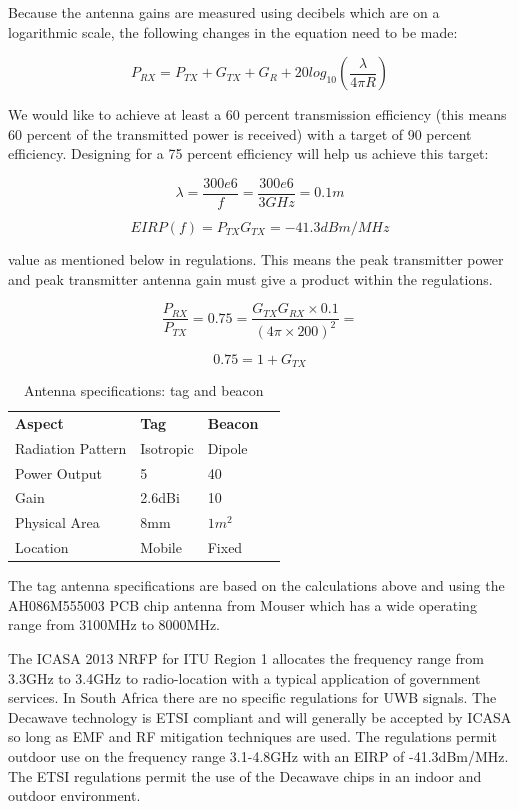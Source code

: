 Because the antenna gains are measured using decibels which are on a logarithmic scale, the following changes in the equation need to be made:

$$P_{RX} = P_{TX} + G_{TX} + G_{R} + 20log_{10}(\frac{\lambda}{4 \pi R})$$


We would like to achieve at least a 60 percent transmission efficiency (this means 60 percent of the transmitted power is received) with a target of 90 percent efficiency. Designing for a 75 percent efficiency will help us achieve this target: 

$$\lambda = \frac{300e6}{f} = \frac{300e6}{3GHz} = 0.1m$$

$$EIRP(f) = P_{TX}G_{TX} = -41.3dBm/MHz$$
\begin{center}
value as mentioned below in regulations. This means the peak transmitter power and peak transmitter antenna gain must give a product within the regulations.
\end{center}

$$\frac{P_{RX}}{P_{TX}} = 0.75 = \frac{G_{TX}G_{RX} \times 0.1}{(4 \pi \times 200)^2} = $$

$$0.75 = 1 + G_{TX}$$

\begin{table}[H]
\centering
\caption{Antenna specifications: tag and beacon}
\label{antenna-specs}
\begin{tabular}{l l l l}
\textbf{Aspect}                      & \textbf{Tag} & \textbf{Beacon} \\ 
Radiation Pattern    	& Isotropic             & Dipole              \\
Power Output 			& 5                     & 40                     \\
Gain                 	& 2.6dBi                     & 10                    \\
Physical Area 			& 8mm					 & $1m^2$          \\         
Location 				& Mobile                & Fixed                    \\         
\end{tabular}
\end{table}

The tag antenna specifications are based on the calculations above and using the AH086M555003 PCB chip antenna from Mouser which has a wide operating range from 3100MHz to 8000MHz.

The ICASA 2013 NRFP for ITU Region 1 allocates the frequency range from 3.3GHz to 3.4GHz to radio-location with a typical application of government services. In South Africa there are no specific regulations for UWB signals. The Decawave technology is ETSI compliant and will generally be accepted by ICASA so long as EMF and RF mitigation techniques are used. The regulations permit outdoor use on the frequency range 3.1-4.8GHz with an EIRP of -41.3dBm/MHz. The ETSI regulations permit the use of the Decawave chips in an indoor and outdoor environment.

